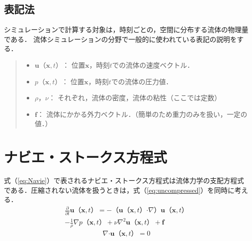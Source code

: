 \documentclass[10pt,a4paper,notitlepage,oneside,twocolumn]{abst_jsarticle}
\begin{document}
\subsection{表記法}
シミュレーションで計算する対象は，時刻ごとの，空間に分布する流体の物理量である．
流体シミュレーションの分野で一般的に使われている表記の説明をする．
\begin{quote}
	\begin{itemize}
		\item $\bm{u}（\bm{x},t）：$ 位置$\bm{x}$，時刻$t$での流体の速度ベクトル．
		\item $p（\bm{x},t）：$ 位置$\bm{x}$，時刻$t$での流体の圧力値．
		\item $\rho，\nu：$ それぞれ，流体の密度，流体の粘性（ここでは定数）
		\item $\bm{f}：$ 流体にかかる外力ベクトル．（簡単のため重力のみを扱い，一定の値．）
	\end{itemize}
\end{quote}
\section{ナビエ・ストークス方程式} \label{chapter:3}
式（\ref{eq:Navie}）で表されるナビエ・ストークス方程式は流体力学の支配方程式である．圧縮されない流体を扱うときは，式（\ref{eq:uncompressed}）を同時に考える．
\begin{equation}\label{eq:Navie}
\begin{split}
\frac{\partial}{\partial t}\bm{u}（\bm{x},t） = -（\bm{u}（\bm{x},t） \boldsymbol{\cdot}\nabla）\bm{u}（\bm{x},t）\\  - \frac{1}{\rho}\nabla p（\bm{x},t） + \nu\nabla^2\bm{u}（\bm{x},t） + \bm{f}
\end{split}
\end{equation}
\begin{equation}\label{eq:uncompressed}
\nabla\boldsymbol{\cdot}\bm{u}（\bm{x},t） = 0
\end{equation}
\end{document}
